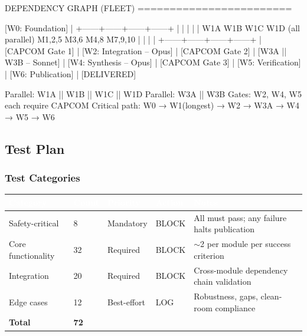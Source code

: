 \documentclass[11pt,letterpaper]{article}
\newcommand{\tableheader}[1]{\textbf{\sffamily\textcolor{white}{#1}}}
\begin{document}
\begin{asciibox}
DEPENDENCY GRAPH (FLEET)
========================

  [W0: Foundation]
         |
  +------+------+------+------+
  |      |      |      |      |
  W1A   W1B    W1C    W1D    (all parallel)
  M1,2,5 M3,6  M4,8  M7,9,10
  |      |      |      |
  +------+------+------+------+
                |
          [CAPCOM Gate 1]
                |
         [W2: Integration -- Opus]
                |
          [CAPCOM Gate 2]
                |
         [W3A || W3B -- Sonnet]
                |
         [W4: Synthesis -- Opus]
                |
          [CAPCOM Gate 3]
                |
         [W5: Verification]
                |
         [W6: Publication]
                |
           [DELIVERED]

Parallel: W1A || W1B || W1C || W1D
Parallel: W3A || W3B
Gates: W2, W4, W5 each require CAPCOM
Critical path: W0 → W1(longest) → W2 → W3A → W4 → W5 → W6
\end{asciibox}

\subsection{Test Plan}

\subsubsection{Test Categories}

\begin{center}
\begin{tabularx}{\textwidth}{L{3.5cm}C{1.5cm}L{2cm}L{1.5cm}X}
\toprule
{}
\tableheader{Category} & \tableheader{Count} & \tableheader{Priority} & \tableheader{Action} & \tableheader{Notes} \\
\midrule
Safety-critical & 8 & Mandatory & BLOCK & All must pass; any failure halts publication \\
Core functionality & 32 & Required & BLOCK & $\sim$2 per module per success criterion \\
Integration & 20 & Required & BLOCK & Cross-module dependency chain validation \\
Edge cases & 12 & Best-effort & LOG & Robustness, gaps, clean-room compliance \\
\midrule
\textbf{Total} & \textbf{72} & & & \\
\end{tabularx}
\end{center}
\end{document}
